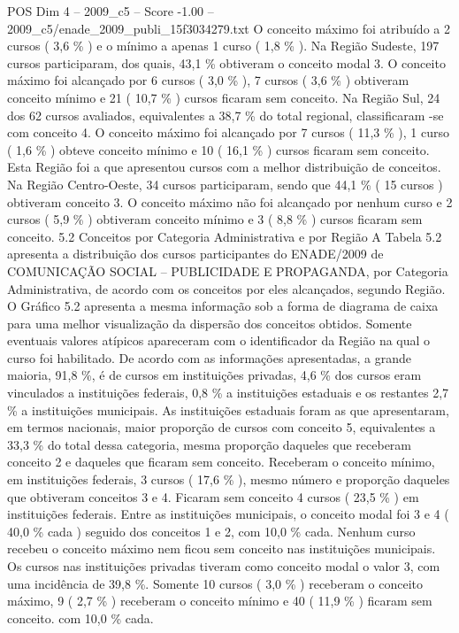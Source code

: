 \begin{textsample}{POS Dim 4 – 2009\_c5 – Score -1.00 – 2009\_c5/enade\_2009\_publi\_15f3034279.txt}
O conceito máximo foi atribuído a 2 cursos ( 3,6 \% ) e o mínimo a apenas 1 curso ( 1,8 \% ).
Na Região Sudeste, 197 cursos participaram, dos quais, 43,1 \% obtiveram o conceito modal 3.
O conceito máximo foi alcançado por 6 cursos ( 3,0 \% ), 7 cursos ( 3,6 \% ) obtiveram conceito mínimo e 21 ( 10,7 \% ) cursos ficaram sem conceito.
Na Região Sul, 24 dos 62 cursos avaliados, equivalentes a 38,7 \% do total regional, classificaram -se com conceito 4.
O conceito máximo foi alcançado por 7 cursos ( 11,3 \% ), 1 curso ( 1,6 \% ) obteve conceito mínimo e 10 ( 16,1 \% ) cursos ficaram sem conceito.
Esta Região foi a que apresentou cursos com a melhor distribuição de conceitos.
Na Região Centro-Oeste, 34 cursos participaram, sendo que 44,1 \% ( 15 cursos ) obtiveram conceito 3.
O conceito máximo não foi alcançado por nenhum curso e 2 cursos ( 5,9 \% ) obtiveram conceito mínimo e 3 ( 8,8 \% ) cursos ficaram sem conceito. 5.2 Conceitos por Categoria Administrativa e por Região A Tabela 5.2 apresenta a distribuição dos cursos participantes do ENADE/2009 de COMUNICAÇÃO SOCIAL – PUBLICIDADE E PROPAGANDA, por Categoria Administrativa, de acordo com os conceitos por eles alcançados, segundo Região.
O Gráfico 5.2 apresenta a mesma informação sob a forma de diagrama de caixa para uma melhor visualização da dispersão dos conceitos obtidos.
Somente eventuais valores atípicos apareceram com o identificador da Região na qual o curso foi habilitado.
De acordo com as informações apresentadas, a grande maioria, 91,8 \%, é de cursos em instituições privadas, 4,6 \% dos cursos eram vinculados a instituições federais, 0,8 \% a instituições estaduais e os restantes 2,7 \% a instituições municipais.
As instituições estaduais foram as que apresentaram, em termos nacionais, maior proporção de cursos com conceito 5, equivalentes a 33,3 \% do total dessa categoria, mesma proporção daqueles que receberam conceito 2 e daqueles que ficaram sem conceito.
Receberam o conceito mínimo, em instituições federais, 3 cursos ( 17,6 \% ), mesmo número e proporção daqueles que obtiveram conceitos 3 e 4.
Ficaram sem conceito 4 cursos ( 23,5 \% ) em instituições federais.
Entre as instituições municipais, o conceito modal foi 3 e 4 ( 40,0 \% cada ) seguido dos conceitos 1 e 2, com 10,0 \% cada.
Nenhum curso recebeu o conceito máximo nem ficou sem conceito nas instituições municipais.
Os cursos nas instituições privadas tiveram como conceito modal o valor 3, com uma incidência de 39,8 \%.
Somente 10 cursos ( 3,0 \% ) receberam o conceito máximo, 9 ( 2,7 \% ) receberam o conceito mínimo e 40 ( 11,9 \% ) ficaram sem conceito. com 10,0 \% cada.

\end{textsample}
